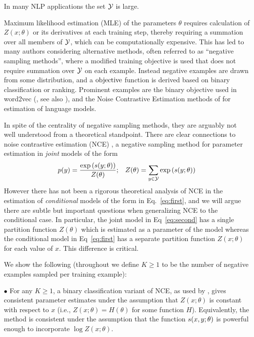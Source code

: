 \documentclass[11pt,a4paper]{article}
\newcommand{\commentout}[1]{}
\newcommand{\loss}{\hbox{objective}}
\begin{document}
In many NLP applications the set ${\cal Y}$ is large.
\commentout{: for example in
language modeling, Word2Vec learning, or machine translation using
seq2seq models, the set ${\cal Y}$ is a vocabulary that can easily
have 10s or even 100s of thousands of words.}
Maximum likelihood
estimation (MLE) of the parameters $\theta$ requires calculation of
$Z(x; \theta)$ or its derivatives at each training step, thereby
requiring a summation over all members of ${\cal Y}$, which can be
computationally expensive. 
This has led to many authors considering alternative methods,
often
referred to as ``negative sampling methods'', where a
modified training objective is used that does not require summation over
${\cal Y}$ on each example. Instead negative examples are drawn
from some distribution, and a $\loss$ function is derived based on binary
classification or ranking. Prominent examples are the binary objective
used in word2vec (\cite{Mikolov:2013}, see also
\cite{Levy:2014:NWE}), and the Noise Contrastive Estimation methods of
\cite{mnih2012fast,jozefowicz2016exploring} for estimation of language
models.

In spite of the centrality of negative sampling methods, they are
arguably not well understood from a theoretical standpoint. There are
clear connections to noise contrastive estimation
(NCE) \cite{gutmann2012noise}, a negative sampling method for
parameter estimation in {\em joint} models of the form
\begin{equation}
p(y ) = \frac{\exp \left ( s(y; \theta) \right )}{Z(\theta)};\;\;\;
Z(\theta) = \sum_{y \in {\cal Y}} \exp \left ( s(y; \theta) \right )
\label{eq:second}
\end{equation}
However there has not been a rigorous theoretical analysis of NCE in
the estimation of {\em conditional} models of the form in
Eq.~\ref{eq:first}, and we will argue there are subtle but important
questions when generalizing NCE to the conditional case. 
In particular, the joint model in Eq~\ref{eq:second} has a single
partition function $Z(\theta)$ which is estimated as a parameter
of the model \cite{gutmann2012noise} whereas the conditional model
in Eq~\ref{eq:first} has a separate partition function $Z(x; \theta)$
for each value of $x$. This difference is critical.

We show the following (throughout we define $K \geq 1$ to
be the number of negative examples sampled per
training example):





$\bullet$ For any $K \geq 1$, a binary classification variant of NCE, as
  used by \cite{mnih2012fast,Mikolov:2013}, gives consistent parameter estimates under the
  assumption that $Z(x; \theta)$ is constant with respect to $x$
  (i.e., $Z(x; \theta) = H(\theta)$ for some function
  $H$). Equivalently, the method is consistent under the assumption
  that the function $s(x, y; \theta)$ is powerful enough to
  incorporate $\log Z(x; \theta)$.
\end{document}
